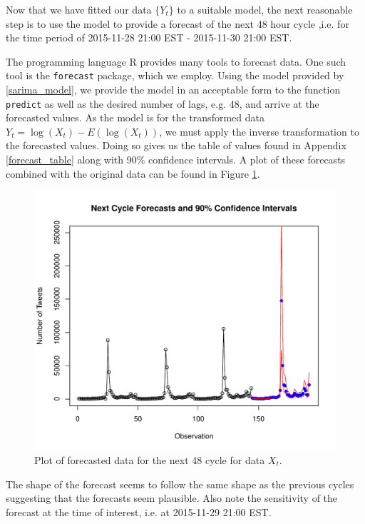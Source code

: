 Now that we have fitted our data $\{Y_t\}$ to a suitable model, the next
reasonable step is to use the model to provide a forecast of the next 48 hour cycle
,i.e. for the time period of 2015-11-28 21:00 EST - 2015-11-30 21:00 EST.

The programming language R provides many tools to forecast data. One such tool
is the \texttt{forecast} package, which we employ. Using the model provided by
\eqref{sarima_model}, we provide the model in an acceptable form to the
function \texttt{predict} as well as the desired number of lags, e.g. 48,
and arrive at the forecasted values. As the model is for the transformed data
$Y_t = \log(X_t) - E(\log(X_t))$, we must apply the inverse transformation to the
forecasted values. Doing so gives us the table of values found in Appendix
\ref{forecast_table} along with 90\% confidence intervals. A plot of these
forecasts combined with the original data can be found in Figure \ref{forecast_plot}.

\begin{figure}[!h]
  \centerline{\includegraphics[scale=0.75]{../analysis/plots/forecast}}
  \caption{Plot of forecasted data for the next 48 cycle for data $X_t$.}\label{forecast_plot}
\end{figure}

The shape of the forecast seems to follow the same shape as the previous cycles
suggesting that the forecasts seem plausible. Also note the sensitivity of
the forecast at the time of interest, i.e. at 2015-11-29 21:00 EST.